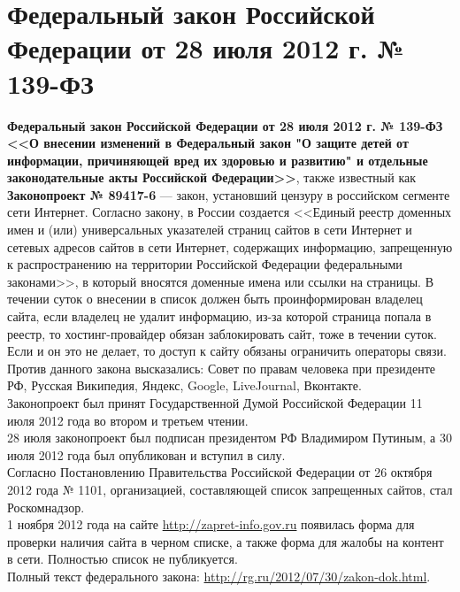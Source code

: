 \section{Федеральный закон Российской Федерации от 28 июля 2012 г. № 139-ФЗ}
\textbf{Федеральный закон Российской Федерации от 28 июля 2012 г. № 139-ФЗ <<О внесении изменений в Федеральный закон "О защите детей от информации, причиняющей вред их здоровью и развитию" и отдельные законодательные акты Российской Федерации>>}, также известный как \textbf{Законопроект № 89417-6} --- закон, установший цензуру в российском сегменте сети Интернет. Согласно закону, в России создается <<Единый реестр доменных имен и (или) универсальных указателей страниц сайтов в сети Интернет и сетевых адресов сайтов в сети Интернет, содержащих информацию, запрещенную к распространению на территории Российской Федерации федеральными законами>>, в который вносятся доменные имена или ссылки на страницы. В течении суток о внесении в список должен быть проинформирован владелец сайта, если владелец не удалит информацию, из-за которой страница попала в реестр, то хостинг-провайдер обязан заблокировать сайт, тоже в течении суток. Если и он это не делает, то доступ к сайту обязаны ограничить операторы связи.\\
Против данного закона высказались: Совет по правам человека при президенте РФ\cite{139_presidentsoviet}, Русская Википедия\cite{139_wiki}, Яндекс\cite{139_yandex}, Google\cite{139_google}, LiveJournal\cite{139_livejournal}, Вконтакте\cite{139_vk}.\\
Законопроект был принят Государственной Думой Российской Федерации 11 июля 2012 года во втором и третьем чтении\cite{139_gosduma}.\\
28 июля законопроект был подписан президентом РФ Владимиром Путиным, а 30 июля 2012 года был опубликован и вступил в силу\cite{139_rg,139_blacklist}.\\
Согласно Постановлению Правительства Российской Федерации от 26 октября 2012 года № 1101, организацией, составляющей список запрещенных сайтов, стал Роскомнадзор\cite{139_1101}.\\
1 ноября 2012 года на сайте \url{http://zapret-info.gov.ru} появилась форма для проверки наличия сайта в черном списке, а также форма для жалобы на контент в сети. Полностью список не публикуется.\\
Полный текст федерального закона: \url{http://rg.ru/2012/07/30/zakon-dok.html}.
